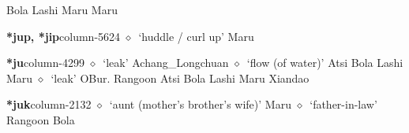 \hspace{1ex}
         Bola 
\hspace{1ex}
         Lashi 
\hspace{1ex}
         Maru 
\hspace{1ex}
         Maru 
  \item {\footnotesize \textbf{*jup, *jip}}{\tiny column-5624}
         $\diamond$~`huddle / curl up'
         Maru 
  \item {\footnotesize \textbf{*ju}}{\tiny column-4299}
         $\diamond$~`leak'
         Achang\_Longchuan 
\hspace{1ex}
         $\diamond$~`flow (of water)'
         Atsi 
\hspace{1ex}
         Bola 
\hspace{1ex}
         Lashi 
\hspace{1ex}
         Maru 
\hspace{1ex}
         $\diamond$~`leak'
         OBur. 
\hspace{1ex}
         Rangoon 
\hspace{1ex}
         Atsi 
\hspace{1ex}
         Bola 
\hspace{1ex}
         Lashi 
\hspace{1ex}
         Maru 
\hspace{1ex}
         Xiandao 
  \item {\footnotesize \textbf{*juk}}{\tiny column-2132}
         $\diamond$~`aunt (mother's brother's wife)'
         Maru 
\hspace{1ex}
         $\diamond$~`father-in-law'
         Rangoon 
\hspace{1ex}
         Bola 
